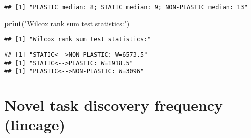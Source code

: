 \documentclass[]{book}
\newenvironment{Shaded}{\begin{snugshade}}{\end{snugshade}}
\newcommand{\ControlFlowTok}[1]{\textcolor[rgb]{0.13,0.29,0.53}{\textbf{#1}}}
\newcommand{\DataTypeTok}[1]{\textcolor[rgb]{0.13,0.29,0.53}{#1}}
\newcommand{\DecValTok}[1]{\textcolor[rgb]{0.00,0.00,0.81}{#1}}
\newcommand{\FloatTok}[1]{\textcolor[rgb]{0.00,0.00,0.81}{#1}}
\newcommand{\KeywordTok}[1]{\textcolor[rgb]{0.13,0.29,0.53}{\textbf{#1}}}
\newcommand{\NormalTok}[1]{#1}
\newcommand{\OperatorTok}[1]{\textcolor[rgb]{0.81,0.36,0.00}{\textbf{#1}}}
\newcommand{\OtherTok}[1]{\textcolor[rgb]{0.56,0.35,0.01}{#1}}
\newcommand{\StringTok}[1]{\textcolor[rgb]{0.31,0.60,0.02}{#1}}
\begin{document}
\begin{verbatim}
## [1] "PLASTIC median: 8; STATIC median: 9; NON-PLASTIC median: 13"
\end{verbatim}

\begin{Shaded}
\begin{Highlighting}[]
\KeywordTok{print}\NormalTok{(}\StringTok{"Wilcox rank sum test statistics:"}\NormalTok{)}
\end{Highlighting}
\end{Shaded}

\begin{verbatim}
## [1] "Wilcox rank sum test statistics:"
\end{verbatim}

\begin{Shaded}
\end{Shaded}

\begin{verbatim}
## [1] "STATIC<-->NON-PLASTIC: W=6573.5"
## [1] "STATIC<-->PLASTIC: W=1918.5"
## [1] "PLASTIC<-->NON-PLASTIC: W=3096"
\end{verbatim}

\hypertarget{novel-task-discovery-frequency-lineage}{%
\section{Novel task discovery frequency (lineage)}\label{novel-task-discovery-frequency-lineage}}
\end{document}
